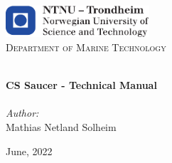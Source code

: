 \begin{titlepage}
\vbox{ }
\vbox{ }
\begin{center}
\includegraphics[width=0.40\textwidth]{Images/NTNU_logo-1.pdf}\\[1cm]
\textsc{\LARGE Department of Marine Technology}\\[1.5cm]
\vbox{ }

\HRule \\[0.4cm]
{ \huge \bfseries CS Saucer - Technical Manual
}\\[0.4cm]
\HRule \\[1.5cm]

\large
\emph{Author:}\\
Mathias Netland Solheim
\vfill

{\large June, 2022}
\end{center}
\end{titlepage}